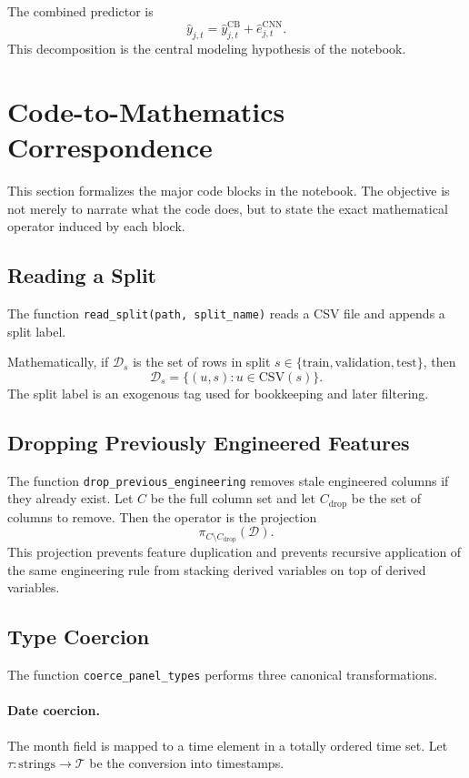 \documentclass[11pt]{article}
\newcommand{\1}{\mathbf{1}}
\newcommand{\D}{\mathcal{D}}
\begin{document}
The combined predictor is
\[
\hat y_{j,t} = \hat y^{\mathrm{CB}}_{j,t} + \hat e^{\mathrm{CNN}}_{j,t}.
\]
This decomposition is the central modeling hypothesis of the notebook.

\section{Code-to-Mathematics Correspondence}

This section formalizes the major code blocks in the notebook. The objective is not merely to narrate what the code does, but to state the exact mathematical operator induced by each block.

\subsection{Reading a Split}

The function \texttt{read\_split(path, split\_name)} reads a CSV file and appends a split label.

Mathematically, if $\D_s$ is the set of rows in split $s \in \{\mathrm{train},\mathrm{validation},\mathrm{test}\}$, then
\[
\D_s = \{(u, s) : u \in \text{CSV}(s)\}.
\]
The split label is an exogenous tag used for bookkeeping and later filtering.

\subsection{Dropping Previously Engineered Features}

The function \texttt{drop\_previous\_engineering} removes stale engineered columns if they already exist. Let $C$ be the full column set and let $C_{\mathrm{drop}}$ be the set of columns to remove. Then the operator is the projection
\[
\pi_{C\setminus C_{\mathrm{drop}}}(\D).
\]
This projection prevents feature duplication and prevents recursive application of the same engineering rule from stacking derived variables on top of derived variables.

\subsection{Type Coercion}

The function \texttt{coerce\_panel\_types} performs three canonical transformations.

\paragraph{Date coercion.}
The month field is mapped to a time element in a totally ordered time set. Let $\tau : \text{strings} \to \mathcal{T}$ be the conversion into timestamps.
\end{document}
